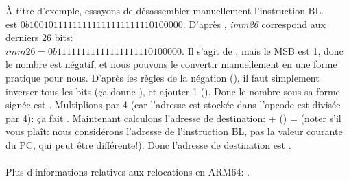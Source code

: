 À titre d'exemple, essayons de désassembler manuellement l'instruction BL.\\
 est $0b10010111111111111111111110100000$.
D'après , \emph{imm26} correspond aux derniers
26 bits:\\
$imm26 = 0b11111111111111111110100000$.
Il s'agit de , mais le \ac{MSB} est 1,
donc le nombre est négatif, et nous pouvons le convertir manuellement en une forme
pratique pour nous.
D'après les règles de la négation (), il faut simplement
inverser tous les bits (ça donne ), et ajouter 1 ().
Donc le nombre sous sa forme signée est .
Multiplions  par 4 (car l'adresse est stockée dans l'opcode est divisée
par 4): ça fait .
Maintenant calculons l'adresse de destination:  + () = 
(noter s'il vous plaît: nous considérons l'adresse de l'instruction BL, pas la valeur
courante du \ac{PC}, qui peut être différente!).
Donc l'adresse de destination est .\\
\\
Plus d'informations relatives aux relocations en ARM64: \ARMELF.
